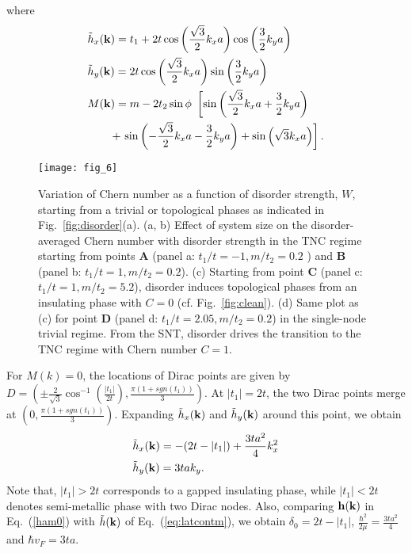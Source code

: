 \documentclass[aps,prb,showpacs,twocolumn,floats]{revtex4-1}
\begin{document}
where 
\begin{align}
&\tilde h_x({\bf k})=t_1+2t\cos\left(\frac{\sqrt{3}}{2} k_x a\right)\cos\left(\frac{3}{2} k_y a\right)\nonumber\\
&\tilde h_y({\bf k})=2t\cos\left(\frac{\sqrt{3}}{2} k_x a\right)\sin\left(\frac{3}{2} k_y a\right)\nonumber\\
&M({\bf k})=m - 2t_2 \sin\phi ~ \left[ \sin\left(\frac{\sqrt{3}}{2} k_x a + \frac{3}{2} k_y a\right) \right.\nonumber\\
&~~~~~~+\left. \sin\left(-\frac{\sqrt{3}}{2} k_x  a-\frac{3}{2} k_y a\right)+\sin\left(\sqrt{3} k_x a \right)\right].
\label{eq:gra}
\end{align}
\begin{figure}
\texttt{[image: fig\_6]}
\caption{Variation of Chern number as a function of disorder strength, $W$, starting from a trivial or topological phases as indicated in Fig.~\ref{fig:disorder}(a). (a, b) Effect of system size on the disorder-averaged Chern number with disorder strength in the TNC regime starting from points {\bf A} (panel a: $t_1/t = -1, m/t_2=0.2$ ) and {\bf B} (panel b: $t_1/t = 1,m/t_2 =0.2$). (c) Starting from point {\bf C} (panel c: $t_1/t = 1, m/t_2=5.2$), disorder induces topological phases from an insulating phase with $C=0$ (cf. Fig.~\eqref{fig:clean}). (d) Same plot as (c) for point {\bf D} (panel d: $t_1/t = 2.05, m/t_2 =0.2$) in the single-node trivial regime. From the SNT, disorder drives the transition to the TNC regime with Chern number $C=1$.}
\label{fig:clean}
\end{figure}
For $M(k)=0$, the locations of Dirac points are given by $D=\left(\pm\frac{2}{\sqrt{3}}\cos^{-1}(\frac{|t_1|}{2t}),\frac{\pi (1+sgn(t_1))}{3}\right)$. At $|t_1|=2t$, the two Dirac points merge at $(0,\frac{\pi (1+sgn(t_1))}{3})$. Expanding $\tilde h_x({\bf k})$ and $\tilde h_y({\bf k} )$ around this point, we obtain 
\begin{align}
&\tilde h_x({\bf k})=-(2t-|t_1|)+\frac{3t a^2}{4}k_x^2\nonumber\\
&\tilde h_y({\bf k})=3t ak_y. 
\label{eq:latcontm}
\end{align}
Note that, $|t_1|>2t$ corresponds  to a gapped insulating phase, while $|t_1|<2t$ denotes semi-metallic phase with two Dirac nodes. Also, comparing ${\bf h(k)}$ in Eq.~(\ref{ham0}) with $\tilde h {(\bf k)}$ of Eq.~(\ref{eq:latcontm}), we obtain $\delta_0= 2t-|t_1| $, $\frac{\hbar^2}{2\mu}= \frac{3t a^2}{4}$ and $\hbar v_F= 3t a$. 
\end{document}
